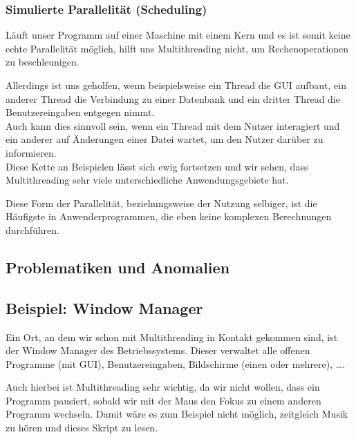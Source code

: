 	\subsubsection{Simulierte Parallelität (Scheduling)}
		Läuft unser Programm auf einer Maschine mit einem Kern und es ist somit keine echte Parallelität möglich, hilft uns Multithreading nicht, um Rechenoperationen zu beschleunigen.
		
		Allerdings ist uns geholfen, wenn beispielsweise ein Thread die GUI aufbaut, ein anderer Thread die Verbindung zu einer Datenbank und ein dritter Thread die Benutzereingaben entgegen nimmt. \\ Auch kann dies sinnvoll sein, wenn ein Thread mit dem Nutzer interagiert und ein anderer auf Änderungen einer Datei wartet, um den Nutzer darüber zu informieren. \\ Diese Kette an Beispielen lässt sich ewig fortsetzen und wir sehen, dass Multithreading sehr viele unterschiedliche Anwendungsgebiete hat.
		
		Diese Form der Parallelität, beziehungsweise der Nutzung selbiger, ist die Häufigste in Anwenderprogrammen, die eben keine komplexen Berechnungen durchführen.

\subsection{Problematiken und Anomalien}

\subsection{Beispiel: Window Manager}
	Ein Ort, an dem wir schon mit Multithreading in Kontakt gekommen sind, ist der Window Manager des Betriebssystems. Dieser verwaltet alle offenen Programme (mit GUI), Benutzereingaben, Bildschirme (einen oder mehrere), \dots.
	
	Auch hierbei ist Multithreading sehr wichtig, da wir nicht wollen, dass ein Programm pausiert, sobald wir mit der Maus den Fokus zu einem anderen Programm wechseln. Damit wäre es zum Beispiel nicht möglich, zeitgleich Musik zu hören und dieses Skript zu lesen.
	
